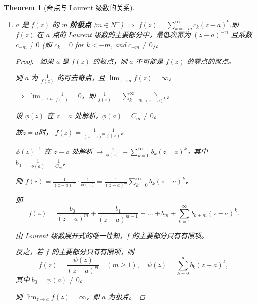 \documentclass[linespread=1.5,openany]{book}%
\def\N{N}%
\theoremstyle{plain}
\newtheorem{theorem}{Theorem}
\newcommand{\N}{\mathbb{N}}                %
\begin{document}
{{{{{{{{\begin{theorem}[奇点与 Laurent 级数的关系]
\begin{enumerate}[label=\arabic*)]
												
												
												
												
												\item $a$ 是 $f(z)$ 的 $m$ \textbf{阶极点} ($m \in \N^+$) $\iff$ $f(z) = \sum_{k=-m}^{\infty} c_k (z-a)^k $.即 $f(z)$ 在 $a$ 点的 Laurent 级数的主要部分中，最低次幂为 $(z-a)^{-m}$ 且系数 $c_{-m} \neq 0$ (即 $c_k=0$ for $k < -m$, and $c_{-m} \neq 0$)。
												
												\begin{proof}\
													如果 $a$ 是 $f(z)$ 的极点，则 $a$ 不可能是 $f(z)$ 的零点的聚点。
													
													则 $a$ 为 $\frac{1}{f(z)}$ 的可去奇点，且 $\lim_{z \to a} f(z) = \infty$。
													
													$\Rightarrow$ $\lim_{z \to a} \frac{1}{f(z)} = 0$，即 $\frac{1}{f(z)} = \sum_{k=m}^{\infty} \frac{b_k}{(z-a)^k}$。
													
													设 $\phi(z)$ 在 $z=a$ 处解析，$\phi(a) = C_m \neq 0$。
													
													故$z=a$时， $f(z) = \frac{1}{(z-a)^m} \frac{1}{\phi(z)}$。
													
													$\phi(z)^{-1}$ 在 $z=a$ 处解析 $\Rightarrow \frac{1}{\phi(z)} = \sum_{k=0}^{\infty} b_k (z-a)^k$，其中 $b_0 = \frac{1}{\phi(a)} = \frac{1}{C_m}$。
													
													则 $f(z) = \frac{1}{(z-a)^m} \cdot \frac{1}{\phi(z)} = \frac{1}{(z-a)^m} \sum_{k=0}^{\infty} b_k (z-a)^k$。
													
													即
													\[
													f(z) = \frac{b_0}{(z-a)^m} + \frac{b_1}{(z-a)^{m-1}} + \dots + b_m + \sum_{k=1}^{\infty} b_{k+m} (z-a)^k.
													\]
													
													由 Laurent 级数展开式的唯一性知，$f$ 的主要部分只有有限项。
													
													反之，若 $f$ 的主要部分只有有限项，则
													\[
													f(z) = \frac{\psi(z)}{(z-a)^m} \quad (m \geq 1), \quad \psi(z) = \sum_{k=0}^{\infty} b_k (z-a)^k,
													\]
													其中 $b_0 = \psi(a) \neq 0$。
													
													则 $\lim_{z \to a} f(z) = \infty$，即 $a$ 为极点。
												\end{proof}
												
												
												
												
												

\end{enumerate}
\end{theorem}}}}}}}}}
\end{document}
